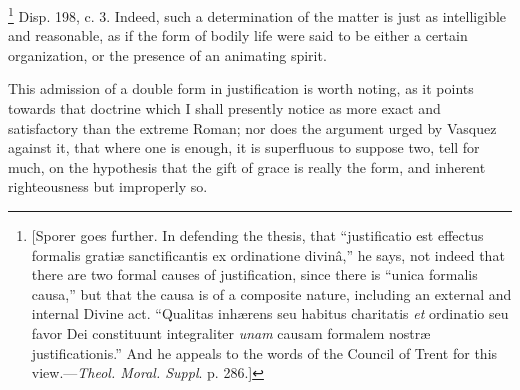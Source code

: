 \footnote{[Sporer goes
further. In defending the thesis, that ``justificatio est effectus
formalis gratiæ sanctificantis ex ordinatione divinâ,'' he says,
not indeed that there are two formal causes of justification, since
there is ``unica formalis causa,'' but that the causa is of a
composite nature, including an external and internal Divine act.
``Qualitas inhærens seu habitus charitatis \emph{et} ordinatio
seu favor Dei constituunt integraliter \emph{unam} causam formalem
nostræ justificationis.'' And he appeals to the words of the
Council of Trent for this view.—\emph{Theol. Moral. Suppl}. p. 286.]} Disp. 198, c. 3. Indeed,
such a determination of the matter is just as intelligible and
reasonable, as if the form of bodily life were said to be either a
certain organization, or the presence of an animating spirit.

This admission of a double form in justification is worth noting,
as it points towards that doctrine which I shall presently notice as
more exact and satisfactory than the extreme Roman; nor does the
argument urged by Vasquez against it, that where one is enough, it is
superfluous to suppose two, tell for much, on the hypothesis that the
gift of grace is really the form, and inherent righteousness but
improperly so.

